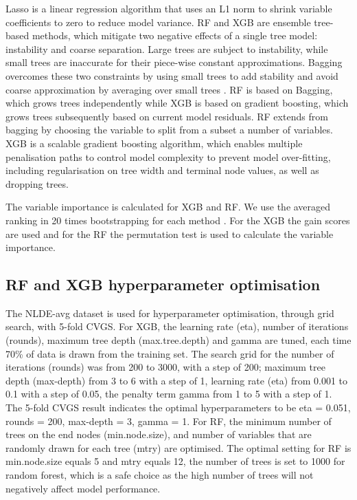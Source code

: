 \documentclass{article}
\begin{document}
Lasso is a linear regression algorithm that uses an L1 norm to shrink variable coefficients to zero to reduce model variance. RF and XGB are ensemble tree-based methods, which mitigate two negative effects of a single tree model: instability and coarse separation. Large trees are subject to instability, while small trees are inaccurate for their piece-wise constant approximations. Bagging overcomes these two constraints by using small trees to add stability and avoid coarse approximation by averaging over small trees \citep{friedman2001greedy}. RF is based on Bagging, which grows trees independently while XGB is based on gradient boosting, which grows trees subsequently based on current model residuals. RF extends from bagging by choosing the variable to split from a subset a number of variables. XGB is a scalable gradient boosting algorithm, which enables multiple penalisation paths to control model complexity to prevent model over-fitting, including regularisation on tree width and terminal node values, as well as dropping trees.  

The variable importance is calculated for XGB and RF. We use the averaged ranking in 20 times bootstrapping for each method \citep{luglobal}. For the XGB the gain scores \citep{chen2016xgboost} are used and for the RF the permutation test is used to calculate the variable importance. 


\subsection{RF and XGB hyperparameter optimisation}

The NLDE-avg dataset is used for hyperparameter optimisation, through grid search, with 5-fold CVGS. For XGB, the learning rate (eta), number of iterations (rounds), maximum tree depth (max.tree.depth) and gamma are tuned, each time 70\% of data is drawn from the training set. The search grid for the number of iterations (rounds) was from 200 to 3000, with a step of 200; maximum tree depth (max-depth) from 3 to 6 with a step of 1, learning rate (eta) from 0.001 to 0.1 with a step of 0.05, the penalty term gamma \citep{xgboost} from 1 to 5 with a step of 1. The 5-fold CVGS result indicates the optimal hyperparameters to be eta = 0.051, rounds = 200, max-depth = 3, gamma = 1. For RF, the minimum number of trees on the end nodes (min.node.size), and number of variables that are randomly drawn for each tree (mtry) are optimised. The optimal setting for RF is min.node.size equals 5 and mtry equals 12, the number of trees is set to 1000 for random forest, which is a safe choice as the high number of trees will not negatively affect model performance.
 
\end{document}
